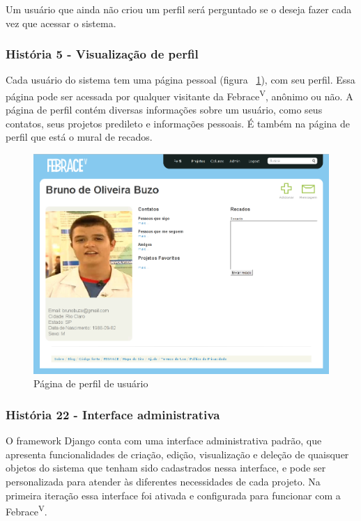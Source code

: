       Um usuário que ainda não criou um perfil será perguntado se o deseja fazer cada vez que acessar o sistema.

    \subsubsection{História 5 - Visualização de perfil}
      Cada usuário do sistema tem uma página pessoal (figura ~\ref{perfil}), com seu perfil. Essa página pode ser acessada por qualquer visitante da Febrace\textsuperscript{V}, anônimo ou não. A página de perfil contém diversas informações sobre um usuário, como seus contatos, seus projetos predileto e informações pessoais. É também na página de perfil que está o mural de recados.

    \begin{figure}[h]
        \begin{center}
    \includegraphics[width=1.0\linewidth]{arquivos/perfil.png}
        \end{center}
        \caption{Página de perfil de usuário}
        \label{perfil}
    \end{figure}

    \subsubsection{História 22 - Interface administrativa}
      O framework Django conta com uma interface administrativa padrão, que apresenta funcionalidades de criação, edição, visualização e deleção de quaisquer objetos do sistema que tenham sido cadastrados nessa interface, e pode ser personalizada para atender às diferentes necessidades de cada projeto. Na primeira iteração essa interface foi ativada e configurada para funcionar com a Febrace\textsuperscript{V}.

